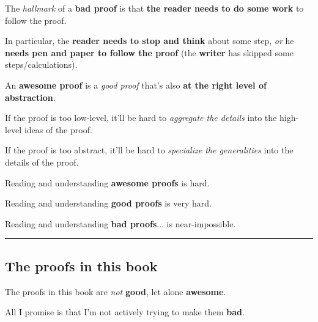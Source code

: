 \vs
The {\it hallmark} of a {\bf bad proof} is that {\bf the reader needs to do some work} to follow the proof. \par
In particular, the {\bf reader needs to stop and think} about some step, {\it or} he {\bf needs pen and paper to follow the proof} (the {\bf writer} has skipped some steps/calculations).

\vs
An {\bf awesome proof} is a {\it good proof} that's also {\bf at the right level of abstraction}. \par
If the proof is too low-level, it'll be hard to {\it aggregate the details} into the high-level ideas of the proof. \par
If the proof is too abstract,  it'll be hard to {\it specialize the generalities} into the details of the proof. \par

\vs
Reading and understanding {\bf awesome proofs} is hard. \par
Reading and understanding {\bf good    proofs} is very hard. \par
Reading and understanding {\bf bad     proofs}... is near-impossible. \par

\vs\hrule\vskip1pt
\subsection{\bf The proofs in this book}

The proofs in this book are {\it not} {\bf good}, let alone {\bf awesome}. \par
All I promise is that I'm not actively trying to make them {\bf bad}. \par




